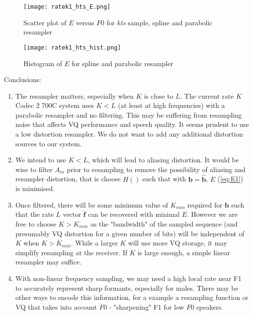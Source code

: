\documentclass{article}
\begin{document}
\begin{figure}[h]
\caption{Scatter plot of $E$ versus $F0$ for \emph{hts} sample, spline and parabolic resampler}
\label{fig:ratek1_hts_E}
\begin{center}
\texttt{[image: ratek1\_hts\_E.png]}
\end{center}
\end{figure}

\begin{figure}[h]
\caption{Histogram of $E$ for spline and parabolic resampler}
\label{fig:ratek1_hts_hist}
\begin{center}
\texttt{[image: ratek1\_hts\_hist.png]}
\end{center}
\end{figure}

Conclusions:
\begin{enumerate}
\item The resampler matters, especially when $K$ is close to $L$.  The current rate $K$ Codec 2 700C system uses $K < L$ (at least at high frequencies) with a parabolic resampler and no filtering.  This may be suffering from resampling noise that affects VQ performance and speech quality. It seems prudent to use a low distortion resampler.  We do not want to add any additional distortion sources to our system.

\item We intend to use $K<L$, which will lead to aliasing distortion.  It would be wise to filter $A_{m}$ prior to resampling to remove the possibility of aliasing and resampler distortion, that is choose $H()$ such that with $\mathbf{b}=\hat{\mathbf{b}}$, $E$ (\ref{eq:E1}) is minimised.

\item Once filtered, there will be some minimum value of $K_{min}$ required for $\mathbf{b}$ such that the rate $L$ vector $\hat{\mathbf{f}}$ can be recovered with minimal $E$. However we are free to choose $K>K_{min}$ as the "bandwidth" of the sampled sequence (and presumably VQ distortion for a given number of bits) will be independent of $K$ when $K>K_{min}$.  While a larger $K$ will use more VQ storage, it may simplify resampling at the receiver.  If $K$ is large enough, a simple linear resampler may suffice.

\item With non-linear frequency sampling, we may need a high local rate near F1 to accurately represent sharp formants, especially for males.  There may be other ways to encode this information, for a example a resampling function or VQ that takes into account $F0$ - "sharpening" F1 for low $F0$ speakers.


\end{enumerate}
\end{document}
